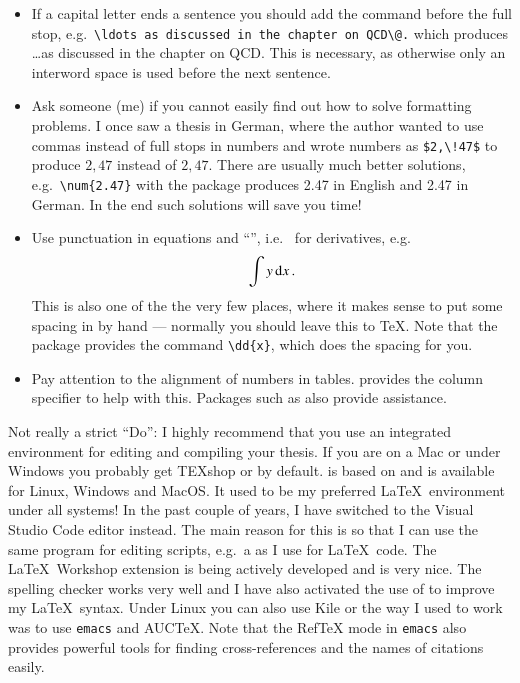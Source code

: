 \begin{itemize}
\item If a capital letter ends a sentence you should add the
  command  before the full stop, e.g.\
  \verb|\ldots as discussed in the chapter on QCD\@.| 
  which produces \ldots as discussed in the chapter on QCD\@.
  This is necessary, as otherwise only an interword space is used 
  before the next sentence.

\item Ask someone (me) if you cannot easily find out how to solve
  formatting problems. I once saw a thesis in German, where the
  author wanted to use commas instead of full stops in numbers and
  wrote numbers as \verb+$2,\!47$+ to produce $2,\!47$ instead of
  $2,47$. There are usually much better solutions, e.g.\
  \verb+\num{2.47}+ with the  package produces
  \num{2.47} in English and \foreignlanguage{ngerman}{\num{2.47}} in
  German. In the end such solutions will save you time!

\item Use punctuation in equations and \enquote{\dif}, i.e.\  for
  derivatives, e.g.
  \begin{equation*}
    \int y\, \text{d} x\,.
  \end{equation*}
  This is also one of the the very few places, where it makes sense
  to put some spacing in by hand --- normally you should leave this to \TeX.
  Note that the \Package{physics} package provides the command \verb|\dd{x}|,
  which does the spacing for you.
  
\item Pay attention to the alignment of numbers in
  tables.  provides the  column specifier to
  help with this. Packages such as  also provide assistance.
\end{itemize}

Not really a strict \enquote{Do}: I highly recommend that you use an
integrated environment for editing and compiling your thesis.
If you are on a Mac or under Windows you probably get TEXshop or
\TeXLive by default. 
\TeXstudio is based on \TeXmaker and is available for Linux,
Windows and MacOS\@.
It used to be my preferred \LaTeX\ environment under all systems!
In the past couple of years,
I have switched to the Visual Studio Code editor instead.
The main reason for this is so that I can use the same program
for editing scripts, e.g.\ a \File{Makefile} as I use for \LaTeX\ code.
The \textsf{\LaTeX\ Workshop} extension is being actively developed
and is very nice.
The \Package{Spell Right} spelling checker works very well
and I have also activated the use of  to improve my \LaTeX\ syntax.
Under Linux you can also use Kile\index{kile} or the way I used to work
was to use \texttt{emacs}\index{emacs} and AUCTeX.
Note that the RefTeX\index{RefTeX} mode in \texttt{emacs} also provides powerful
tools for finding cross-references and the names of citations easily.


